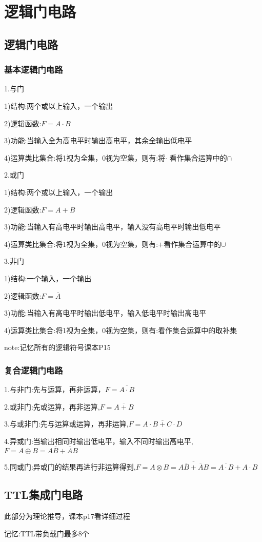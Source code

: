 \documentclass[11pt,twoside,a4paper]{ctexart}
\begin{document}
    \section{逻辑门电路}
    \subsection{逻辑门电路}
    \subsubsection{基本逻辑门电路}
    1.与门

    1)结构:两个或以上输入，一个输出

    2)逻辑函数:$F = A\cdot B $

    3)功能:当输入全为高电平时输出高电平，其余全输出低电平

    4)运算类比集合:将1视为全集，0视为空集，则有:将$\cdot $ 看作集合运算中的$\cap $ 

    2.或门

    1)结构:两个或以上输入，一个输出

    2)逻辑函数:$F = A + B $

    3)功能:当输入有高电平时输出高电平，输入没有高电平时输出低电平

    4)运算类比集合:将1视为全集，0视为空集，则有:$ + $看作集合运算中的$\cup $ 
    
    3.非门

    1)结构:一个输入，一个输出

    2)逻辑函数:$F =\overline{A}$

    3)功能:当输入有高电平时输出低电平，输入低电平时输出高电平

    4)运算类比集合:将1视为全集，0视为空集，则有:看作集合运算中的取补集

    note:记忆所有的逻辑符号课本P15

    \subsubsection{复合逻辑门电路}
    1.与非门:先与运算，再非运算，$F = \overline{A\cdot B} $

    2.或非门:先或运算，再非运算,$F = \overline{A + B} $

    3.与或非门:先与运算或运算，再非运算,$F = \overline{A\cdot B + C\cdot D} $

    4.异或门:当输出相同时输出低电平，输入不同时输出高电平,$F = A\oplus B = A\overline{B} + \overline{A}B $

    5.同或门:异或门的结果再进行非运算得到,$F = A\otimes B = \overline{A\overline{B} + \overline{A}B} = \overline{A\cdot B} + A\cdot B $


    \subsection{TTL集成门电路}
    此部分为理论推导，课本p17看详细过程

    记忆:TTL带负载门最多8个
\end{document}
